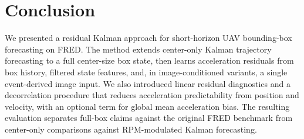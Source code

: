 \section{Conclusion}

We presented a residual Kalman approach for short-horizon UAV bounding-box forecasting on FRED. The method extends center-only Kalman trajectory forecasting to a full center-size box state, then learns acceleration residuals from box history, filtered state features, and, in image-conditioned variants, a single event-derived image input. We also introduced linear residual diagnostics and a decorrelation procedure that reduces acceleration predictability from position and velocity, with an optional term for global mean acceleration bias. The resulting evaluation separates full-box claims against the original FRED benchmark from center-only comparisons against RPM-modulated Kalman forecasting. 
